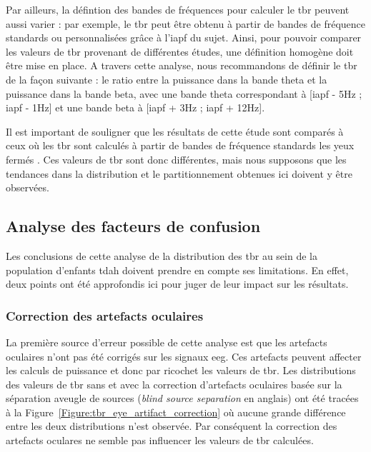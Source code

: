 Par ailleurs, la défintion des bandes de fréquences pour calculer le \gls{tbr} peuvent aussi varier : par exemple, le \gls{tbr} peut être obtenu à partir
de bandes de fréquence standards ou personnalisées grâce à l'\gls{iapf} du sujet. Ainsi, pour pouvoir comparer les valeurs de \gls{tbr} provenant de différentes
études, une définition homogène doit être mise en place. A travers cette analyse, nous recommandons de définir le \gls{tbr} de la façon suivante : 
le ratio entre la puissance dans la bande theta et la puissance dans la bande beta, avec une bande theta correspondant à [\gls{iapf} - 5Hz ; \gls{iapf} - 1Hz]
et une bande beta à [\gls{iapf} + 3Hz ; \gls{iapf} + 12Hz].

Il est important de souligner que les résultats de cette étude sont comparés à ceux où les \gls{tbr} sont calculés à partir de bandes de fréquence standards
les yeux fermés \citep{Zhang2017, Clarke2011}. Ces valeurs de \gls{tbr} sont donc différentes, mais nous supposons que les tendances dans la distribution et le
partitionnement obtenues ici doivent y être observées.

\subsection{Analyse des facteurs de confusion}

Les conclusions de cette analyse de la distribution des \gls{tbr} au sein de la population d'enfants \gls{tdah} doivent prendre en compte ses limitations.
En effet, deux points ont été approfondis ici pour juger de leur impact sur les résultats.

\subsubsection{Correction des artefacts oculaires}

La première source d'erreur possible de cette analyse est que les artefacts oculaires n'ont pas été corrigés sur les signaux \gls{eeg}. Ces artefacts
peuvent affecter les calculs de puissance et donc par ricochet les valeurs de \gls{tbr}. Les distributions des valeurs de \gls{tbr} sans et avec 
la correction d'artefacts oculaires basée sur la séparation aveugle de sources (\textit{blind source separation} en anglais) \citep{Barthelemy2017} 
ont été tracées à la Figure~\ref{Figure:tbr_eye_artifact_correction} où aucune grande différence entre les deux distributions n'est observée.
Par conséquent la correction des artefacts oculares ne semble pas influencer les valeurs de \gls{tbr} calculées.

